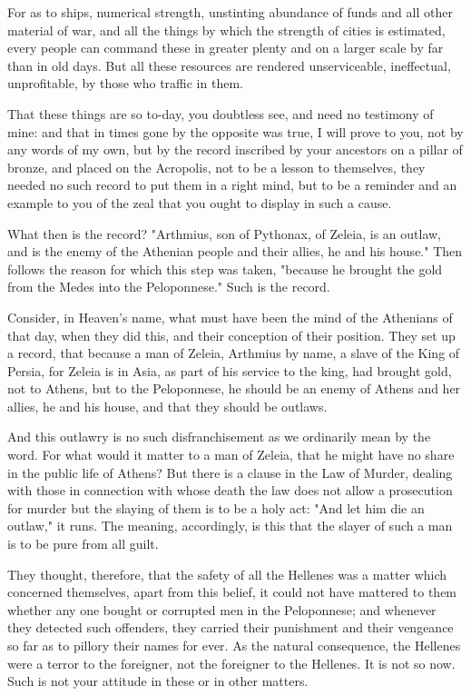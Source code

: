 \documentclass[a4paper]{amsbook}
\begin{document}
For as to ships, numerical strength, unstinting abundance of funds and all other material of war, and all the things by which the strength of cities is estimated, every people can command these in greater plenty and on a larger scale by far than in old days. But all these resources are rendered unserviceable, ineffectual, unprofitable, by those who traffic in them.

That these things are so to-day, you doubtless see, and need no testimony of mine: and that in times gone by the opposite was true, I will prove to you, not by any words of my own, but by the record inscribed by your ancestors on a pillar of bronze, and placed on the Acropolis, not to be a lesson to themselves, they needed no such record to put them in a right mind, but to be a reminder and an example to you of the zeal that you ought to display in such a cause.

What then is the record? "Arthmius, son of Pythonax, of Zeleia, is an outlaw, and is the enemy of the Athenian people and their allies, he and his house." Then follows the reason for which this step was taken, "because he brought the gold from the Medes into the Peloponnese." Such is the record.

Consider, in Heaven's name, what must have been the mind of the Athenians of that day, when they did this, and their conception of their position. They set up a record, that because a man of Zeleia, Arthmius by name, a slave of the King of Persia, for Zeleia is in Asia, as part of his service to the king, had brought gold, not to Athens, but to the Peloponnese, he should be an enemy of Athens and her allies, he and his house, and that they should be outlaws.

And this outlawry is no such disfranchisement as we ordinarily mean by the word. For what would it matter to a man of Zeleia, that he might have no share in the public life of Athens? But there is a clause in the Law of Murder, dealing with those in connection with whose death the law does not allow a prosecution for murder but the slaying of them is to be a holy act: "And let him die an outlaw," it runs. The meaning, accordingly, is this that the slayer of such a man is to be pure from all guilt.

They thought, therefore, that the safety of all the Hellenes was a matter which concerned themselves, apart from this belief, it could not have mattered to them whether any one bought or corrupted men in the Peloponnese; and whenever they detected such offenders, they carried their punishment and their vengeance so far as to pillory their names for ever. As the natural consequence, the Hellenes were a terror to the foreigner, not the foreigner to the Hellenes. It is not so now. Such is not your attitude in these or in other matters.
\end{document}
